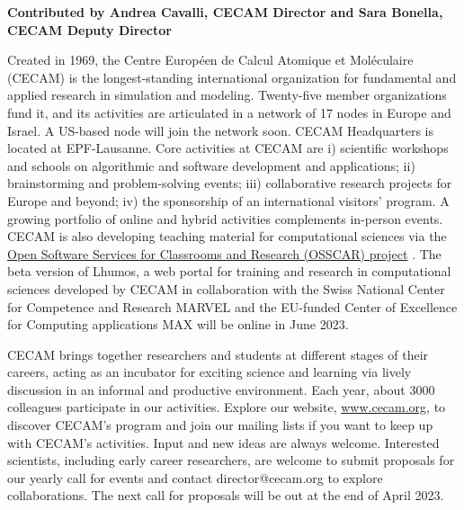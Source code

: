 \textbf{Contributed by Andrea Cavalli, CECAM Director and Sara Bonella, CECAM Deputy Director}

Created in 1969, the Centre Européen de Calcul Atomique et Moléculaire (CECAM) is the longest-standing international organization for fundamental and applied research in simulation and modeling. 
Twenty-five member organizations fund it, and its activities are articulated in a network of 17 nodes in Europe and Israel. 
A US-based node will join the network soon. 
CECAM Headquarters is located at EPF-Lausanne. 
Core activities at CECAM are i) scientific workshops and schools on algorithmic and software development and applications; ii) brainstorming and problem-solving events; iii) collaborative research projects for Europe and beyond; iv) the sponsorship of an international visitors’ program. 
A growing portfolio of online and hybrid activities complements in-person events. 
CECAM is also developing teaching material for computational sciences via the \href{https://www.osscar.org/}{Open Software Services for Classrooms and Research (OSSCAR) project} \cite{DU2023}. 
The beta version of Lhumos, a web portal for training and research in computational sciences developed by CECAM in collaboration with the Swiss National Center for Competence and Research MARVEL and the EU-funded Center of Excellence for Computing applications MAX will be online in June 2023.
 
CECAM brings together researchers and students at different stages of their careers, acting as an incubator for exciting science and learning via lively discussion in an informal and productive environment. 
Each year, about 3000 colleagues participate in our activities. 
Explore our website, \href{https://www.cecam.org/}{www.cecam.org}, to discover CECAM’s program and join our mailing lists if you want to keep up with CECAM’s activities. 
Input and new ideas are always welcome. 
Interested scientists, including early career researchers, are welcome to submit proposals for our yearly call for events and contact director@cecam.org to explore collaborations. 
The next call for proposals will be out at the end of April 2023.